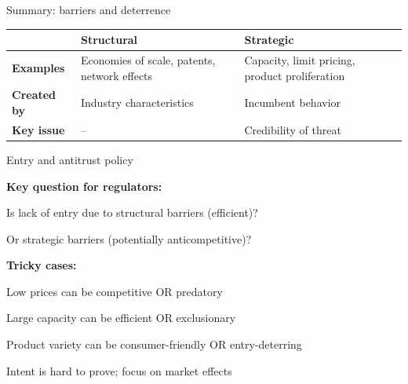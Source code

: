 \documentclass[notes,11pt, aspectratio=169]{beamer}
\newenvironment{wideitemize}{\itemize\addtolength{\itemsep}{10pt}}{\enditemize}
\begin{document}
\begin{frame}{Summary: barriers and deterrence}
	\begin{center}
		\begin{tabular}{|l|p{4cm}|p{4cm}|}
			\hline
			& \textbf{Structural} & \textbf{Strategic} \\
			\hline
			\textbf{Examples} & Economies of scale, patents, network effects & Capacity, limit pricing, product proliferation \\
			\hline
			\textbf{Created by} & Industry characteristics & Incumbent behavior \\
			\hline
			\textbf{Key issue} & -- & Credibility of threat \\
			\hline
		\end{tabular}
	\end{center}
\end{frame}

\begin{frame}{Entry and antitrust policy}
	\begin{wideitemize}
		\item \textbf{Key question for regulators:}
		\begin{wideitemize}
			\vspace{5pt}
			\item Is lack of entry due to structural barriers (efficient)?
			\item Or strategic barriers (potentially anticompetitive)?
		\end{wideitemize}
		\item \textbf{Tricky cases:}
		\begin{wideitemize}
			\vspace{5pt}
			\item Low prices can be competitive OR predatory
			\item Large capacity can be efficient OR exclusionary
			\item Product variety can be consumer-friendly OR entry-deterring
		\end{wideitemize}
		\item Intent is hard to prove; focus on market effects
	\end{wideitemize}
\end{frame}
\end{document}

